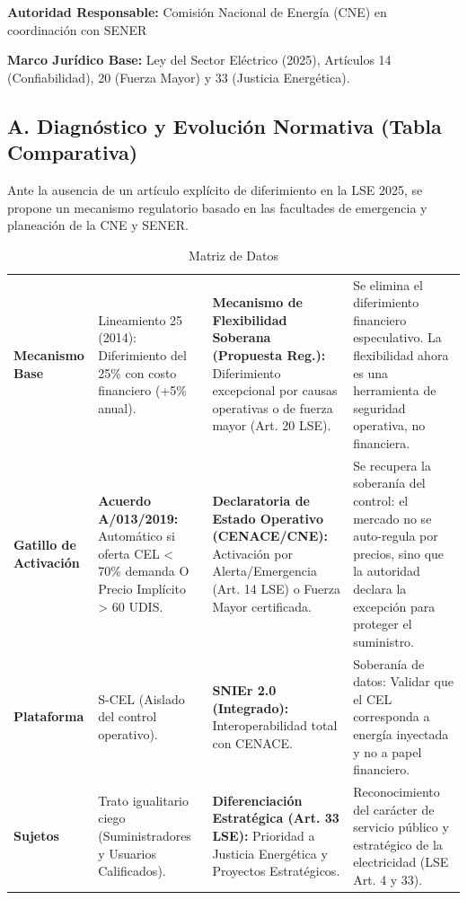\documentclass{cel}
\begin{document}
\textbf{Autoridad Responsable:} Comisión Nacional de Energía (CNE) en coordinación con SENER

\textbf{Marco Jurídico Base:} Ley del Sector Eléctrico (2025), Artículos 14 (Confiabilidad), 20 (Fuerza Mayor) y 33 (Justicia Energética).


\subsection{A. Diagnóstico y Evolución Normativa (Tabla Comparativa)}
\nopagebreak

Ante la ausencia de un artículo explícito de \textquotedbl{}diferimiento\textquotedbl{} en la LSE 2025, se propone un mecanismo regulatorio basado en las facultades de emergencia y planeación de la CNE y SENER.


\vspace{0.3cm}
\begin{tabladoradoLargo}
\renewcommand{\tabularxcolumn}[1]{p{#1}}
\begin{xltabular}{\textwidth}{|X|X|X|X|}
\caption{Matriz de Datos} \\
\toprule
{}  &  &  &  \\
\midrule
\endhead
\textbf{Mecanismo Base} & Lineamiento 25 (2014): Diferimiento del 25\% con costo financiero (+5\% anual). & \textbf{Mecanismo de Flexibilidad Soberana (Propuesta Reg.):} Diferimiento excepcional por causas operativas o de fuerza mayor (Art. 20 LSE). & Se elimina el diferimiento financiero especulativo. La flexibilidad ahora es una herramienta de seguridad operativa, no financiera. \\ \hline
\textbf{Gatillo de Activación} & \textbf{Acuerdo A/013/2019:} Automático si oferta CEL \textless{} 70\% demanda O Precio Implícito \textgreater{} 60 UDIS. & \textbf{Declaratoria de Estado Operativo (CENACE/CNE):} Activación por Alerta/Emergencia (Art. 14 LSE) o Fuerza Mayor certificada. & Se recupera la soberanía del control: el mercado no se \textquotedbl{}auto-regula\textquotedbl{} por precios, sino que la autoridad declara la excepción para proteger el suministro. \\ \hline
\textbf{Plataforma} & S-CEL (Aislado del control operativo). & \textbf{SNIEr 2.0 (Integrado):} Interoperabilidad total con CENACE. & Soberanía de datos: Validar que el CEL corresponda a energía inyectada y no a \textquotedbl{}papel\textquotedbl{} financiero. \\ \hline
\textbf{Sujetos} & Trato igualitario ciego (Suministradores y Usuarios Calificados). & \textbf{Diferenciación Estratégica (Art. 33 LSE):} Prioridad a Justicia Energética y Proyectos Estratégicos. & Reconocimiento del carácter de servicio público y estratégico de la electricidad (LSE Art. 4 y 33). \\ \hline
\bottomrule
\end{xltabular}
\end{tabladoradoLargo}
\end{document}
